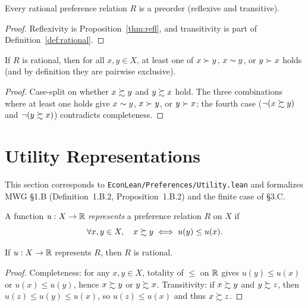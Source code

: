 \begin{proposition}
\label{thm:isPreorder}
\leanok
{}
Every rational preference relation $R$ is a preorder (reflexive and transitive).
\end{proposition}
\begin{proof}
\leanok
Reflexivity is Proposition~\ref{thm:refl}, and transitivity is part of Definition~\ref{def:rational}.
\end{proof}

\begin{proposition}[Trichotomy]
\label{thm:trichotomy}
\leanok
{}
If $R$ is rational, then for all $x, y \in X$, at least one of $x \succ y$,
$x \sim y$, or $y \succ x$ holds (and by definition they are pairwise exclusive).
\end{proposition}
\begin{proof}
\leanok
Case-split on whether $x \succsim y$ and $y \succsim x$ hold. The three combinations where at
least one holds give $x \sim y$, $x \succ y$, or $y \succ x$; the fourth case
($\neg(x \succsim y)$ and $\neg(y \succsim x)$) contradicts completeness.
\end{proof}


\section{Utility Representations}
\label{sec:utility}

This section corresponds to \texttt{EconLean/Preferences/Utility.lean} and formalizes
MWG \S1.B (Definition~1.B.2, Proposition~1.B.2) and the finite case of \S3.C.

\begin{definition}
\label{def:represents}
\leanok
A function $u : X \to \mathbb{R}$ \emph{represents} a preference relation $R$ on $X$ if
\[
  \forall x, y \in X,\quad x \succsim y \iff u(y) \le u(x).
\]
\end{definition}

\begin{theorem}
\label{thm:represents_rational}
\leanok
{}
If $u : X \to \mathbb{R}$ represents $R$, then $R$ is rational.
\end{theorem}
\begin{proof}
\leanok
Completeness: for any $x, y \in X$, totality of $\le$ on $\mathbb{R}$ gives $u(y) \le u(x)$ or
$u(x) \le u(y)$, hence $x \succsim y$ or $y \succsim x$. Transitivity: if $x \succsim y$ and
$y \succsim z$, then $u(z) \le u(y) \le u(x)$, so $u(z) \le u(x)$ and thus $x \succsim z$.
\end{proof}

